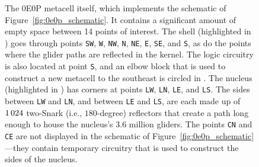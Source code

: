 \begin{figure}[!phtb]
	\centering
		\caption{The 0E0P metacell itself, which implements the schematic of Figure~\ref{fig:0e0p_schematic}. It contains a significant amount of empty space between 14 points of interest. The shell (highlighted in ) goes through points \texttt{SW}, \texttt{W}, \texttt{NW}, \texttt{N}, \texttt{NE}, \texttt{E}, \texttt{SE}, and \texttt{S}, as do the points where the glider paths are reflected in the kernel. The logic circuitry is also located at point \texttt{S}, and an elbow block that is used to construct a new metacell to the southeast is circled in . The nucleus (highlighted in ) has corners at points \texttt{LW}, \texttt{LN}, \texttt{LE}, and \texttt{LS}. The sides between \texttt{LW} and \texttt{LN}, and between \texttt{LE} and \texttt{LS}, are each made up of $1{\,}024$ two-Snark (i.e., $180$-degree) reflectors that create a path long enough to house the nucleus's 3.6 million gliders. The points \texttt{CN} and \texttt{CE} are not displayed in the schematic of Figure~\ref{fig:0e0p_schematic}---they contain temporary circuitry that is used to construct the sides of the nucleus.}\label{fig:0e0p_itself}
\end{figure}

